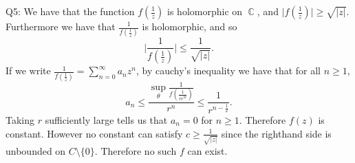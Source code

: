 \documentclass[letterpaper]{article}
\DeclareMathOperator{\C}{\mathbb{C}}
\begin{document}
 \noindent Q5: 
We have that the function $f(\frac{1}{z})$ is holomorphic on $\C$, and $\Big|f(\frac{1}{z}) \Big| \geq \sqrt{|z|}$.
Furthermore we have that $\frac{1}{f(\frac{1}{z})}$ is holomorphic, and so $$\Big| \frac{1}{f(\frac{1}{z})} \Big| \leq \frac{1}{\sqrt{|z|}}.$$ 
If we write $\frac{1}{f(\frac{1}{z})} = \sum_{n=0}^\infty a_n z^n$, by cauchy's inequality we have that for all $n\geq 1 $, 
$$a_n \leq \frac{\sup_{\theta} \frac{1}{f(\frac{1}{re^{i\theta}})} }{r^n} \leq \frac{1}{r^{n-\frac{1}{2}}}.$$ 
Taking $r$ sufficiently large tells us that $a_n=0$ for $n\geq 1$. Therefore $f(z)$ is constant. However no constant can satisfy $c\geq \frac{1}{\sqrt{|z|}}$ since the righthand side is unbounded on $C \setminus \{0\}$. Therefore no such $f$ can exist. 
\end{document}
